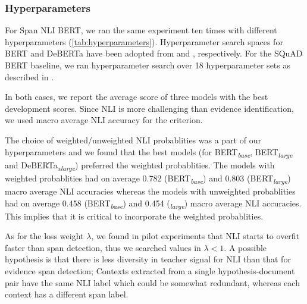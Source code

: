 \subsubsection{Hyperparameters}\label{sec:appendix-experiments-hyperparameters}

For Span NLI BERT, we ran the same experiment ten times with different hyperparameters (\cref{tab:hyperparameters}).
Hyperparameter search spaces for BERT and DeBERTa have been adopted from \cite{devlin_bert_2019} and \cite{he_deberta_2021}, respectively.
For the SQuAD BERT baseline, we ran hyperparameter search over 18 hyperparameter sets as described in \cite{devlin_bert_2019}.

In both cases, we report the average score of three models with the best development scores.
Since NLI is more challenging than evidence identification, we used macro average NLI accuracy for the criterion.

The choice of weighted/unweighted NLI probablities was a part of our hyperparameters and we found that the best models (for BERT\textsubscript{\textit{base}}, BERT\textsubscript{\textit{large}} and DeBERTa\textsubscript{\textit{xlarge}}) preferred the weighted probablities.
The models with weighted probablities had on average 0.782 (BERT\textsubscript{\textit{base}}) and 0.803 (BERT\textsubscript{\textit{large}}) macro average NLI accuracies whereas the models with unweighted probablities had on average 0.458 (BERT\textsubscript{\textit{base}}) and 0.454 (\textsubscript{\textit{large}}) macro average NLI accuracies.
This implies that it is critical to incorporate the weighted probablities.

As for the loss weight $\lambda$, we found in pilot experiments that NLI starts to overfit faster than span detection, thus we searched values in $\lambda < 1$.
A possible hypothesis is that there is less diversity in teacher signal for NLI than that for evidence span detection; Contexts extracted from a single hypothesis-document pair have the same NLI label which could be somewhat redundant, whereas each context has a different span label.
